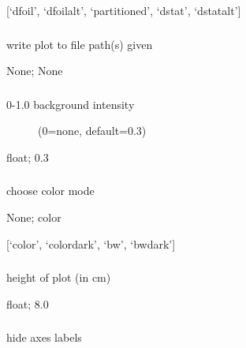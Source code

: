 \documentclass[letterpaper,12pt,english]{sphinxmanual}
\begin{document}
 {[}‘dfoil’, ‘dfoilalt’, ‘partitioned’, ‘dstat’, ‘dstatalt’{]}


\subsubsection{}
\label{\detokenize{prog_desc:plot}}
 write plot to file path(s) given

 None;  None


\subsubsection{}
\label{\detokenize{prog_desc:plot-background}}\begin{description}
\item[{ 0-1.0 background intensity}] \leavevmode
(0=none, default=0.3)

\end{description}

 float;  0.3


\subsubsection{}
\label{\detokenize{prog_desc:plot-color}}
 choose color mode

 None;  color

 {[}‘color’, ‘colordark’, ‘bw’, ‘bwdark’{]}


\subsubsection{}
\label{\detokenize{prog_desc:plot-height}}
 height of plot (in cm)

 float;  8.0


\subsubsection{}
\label{\detokenize{prog_desc:plot-hideaxes}}
 hide axes labels
\end{document}

